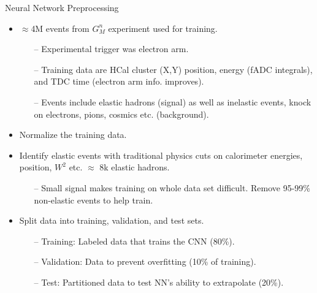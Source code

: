 \documentclass[10pt]{beamer}
\begin{document}
\begin{frame}{Neural Network Preprocessing}

	\begin{itemize}
		\item $\approx$4M events from $G_M^n$ experiment used for training.
		\begin{itemize}
			\item[--] Experimental trigger was electron arm.%
			\item[--] \alert{Training data are HCal cluster (X,Y) position, energy (fADC integrals), and TDC time (electron arm info. improves).} 
			\item[--] Events include elastic hadrons (signal) as well as inelastic events, knock on electrons, pions, cosmics etc. (background). 
		\end{itemize}
		\item Normalize the training data.
		\item Identify elastic events with traditional physics cuts on calorimeter energies, position, $W^2$ etc. \alert{$\approx$ 8k elastic hadrons.}
			\begin{itemize}
				\item[--] Small signal makes training on whole data set difficult. Remove 95-99\% non-elastic events to help train.
			\end{itemize}
		\item Split data into training, validation, and test sets.
		\begin{itemize}
			\item[--] \alert{Training: Labeled data that trains the CNN (80\%).}
			\item[--] \alert{Validation: Data to prevent overfitting (10\% of training).}
			\item[--] \alert{Test: Partitioned data to test NN's ability to extrapolate (20\%).}
		\end{itemize}
	\end{itemize}

\end{frame}
\end{document}
